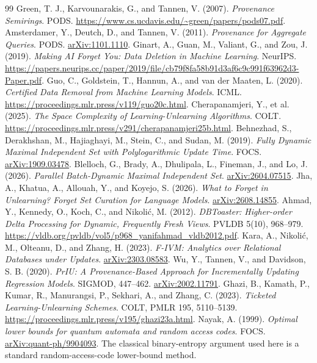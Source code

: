 \documentclass[11pt,a4paper]{article}
\theoremstyle{definition}\newtheorem{definition}[theorem]{Definition}
\begin{document}
\begin{thebibliography}{99}
 Green, T. J., Karvounarakis, G., and Tannen, V. (2007). \emph{Provenance Semirings}. PODS. \url{https://www.cs.ucdavis.edu/~green/papers/pods07.pdf}.
 Amsterdamer, Y., Deutch, D., and Tannen, V. (2011). \emph{Provenance for Aggregate Queries}. PODS. \href{https://arxiv.org/abs/1101.1110}{arXiv:1101.1110}.
 Ginart, A., Guan, M., Valiant, G., and Zou, J. (2019). \emph{Making AI Forget You: Data Deletion in Machine Learning}. NeurIPS. \url{https://papers.neurips.cc/paper/2019/file/cb79f8fa58b91d3af6c9c991f63962d3-Paper.pdf}.
 Guo, C., Goldstein, T., Hannun, A., and van der Maaten, L. (2020). \emph{Certified Data Removal from Machine Learning Models}. ICML. \url{https://proceedings.mlr.press/v119/guo20c.html}.
 Cherapanamjeri, Y., et al. (2025). \emph{The Space Complexity of Learning-Unlearning Algorithms}. COLT. \url{https://proceedings.mlr.press/v291/cherapanamjeri25b.html}.
 Behnezhad, S., Derakhshan, M., Hajiaghayi, M., Stein, C., and Sudan, M. (2019). \emph{Fully Dynamic Maximal Independent Set with Polylogarithmic Update Time}. FOCS. \href{https://arxiv.org/abs/1909.03478}{arXiv:1909.03478}.
 Blelloch, G., Brady, A., Dhulipala, L., Fineman, J., and Lo, J. (2026). \emph{Parallel Batch-Dynamic Maximal Independent Set}. \href{https://arxiv.org/abs/2604.07515}{arXiv:2604.07515}.
 Jha, A., Khatua, A., Allouah, Y., and Koyejo, S. (2026). \emph{What to Forget in Unlearning? Forget Set Curation for Language Models}. \href{https://arxiv.org/abs/2608.14855}{arXiv:2608.14855}.
 Ahmad, Y., Kennedy, O., Koch, C., and Nikoli\'{c}, M. (2012). \emph{DBToaster: Higher-order Delta Processing for Dynamic, Frequently Fresh Views}. PVLDB 5(10), 968--979. \url{https://vldb.org/pvldb/vol5/p968_yanifahmad_vldb2012.pdf}.
 Kara, A., Nikoli\'{c}, M., Olteanu, D., and Zhang, H. (2023). \emph{F-IVM: Analytics over Relational Databases under Updates}. \href{https://arxiv.org/abs/2303.08583}{arXiv:2303.08583}.
 Wu, Y., Tannen, V., and Davidson, S. B. (2020). \emph{PrIU: A Provenance-Based Approach for Incrementally Updating Regression Models}. SIGMOD, 447--462. \href{https://arxiv.org/abs/2002.11791}{arXiv:2002.11791}.
 Ghazi, B., Kamath, P., Kumar, R., Manurangsi, P., Sekhari, A., and Zhang, C. (2023). \emph{Ticketed Learning-Unlearning Schemes}. COLT, PMLR 195, 5110--5139. \url{https://proceedings.mlr.press/v195/ghazi23a.html}.
 Nayak, A. (1999). \emph{Optimal lower bounds for quantum automata and random access codes}. FOCS. \href{https://arxiv.org/abs/quant-ph/9904093}{arXiv:quant-ph/9904093}. The classical binary-entropy argument used here is a standard random-access-code lower-bound method.

\end{thebibliography}
\end{document}
